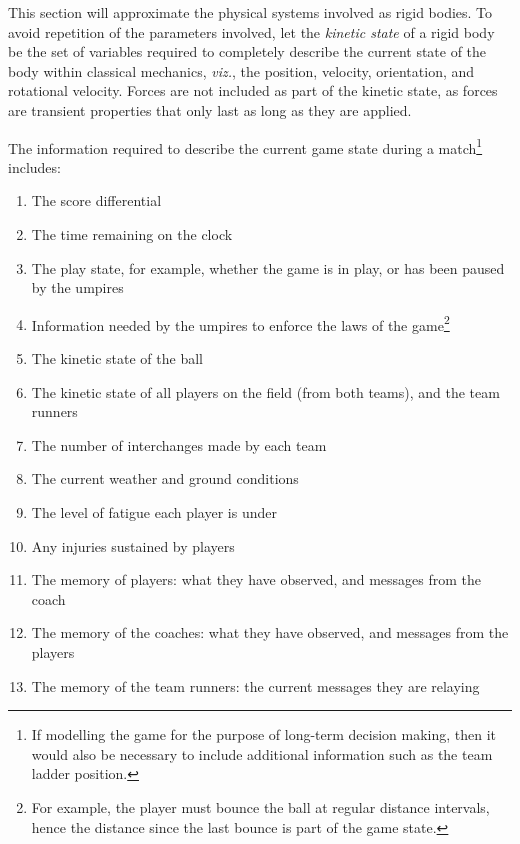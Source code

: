 
This section will approximate the physical systems involved as rigid bodies. To avoid repetition of the parameters involved, let the \textit{kinetic state} of a rigid body be the set of variables required to completely describe the current state of the body within classical mechanics, \textit{viz.}, the position, velocity,
orientation, and rotational velocity. Forces are not included as part of the kinetic state, as forces are transient properties that only last as long as they are applied.

The information required to describe the current game state during a match\footnote{If modelling the game for the purpose of long-term decision making, then it would also be necessary to include additional information such as the team ladder position.} includes:

\begin{enumerate}
\item
  The score differential
\item
  The time remaining on the clock
\item
  The play state, for example, whether the game is in play, or has been
  paused by the umpires
\item
  Information needed by the umpires to enforce the laws of the game\footnote{For
  example, the player must bounce the ball at regular distance
  intervals, hence the distance since the last bounce is part of the
  game state.}
\item
  The kinetic state of the ball
\item
  The kinetic state of all players on the field (from both teams), and the team runners
\item
  The number of interchanges made by each team
\item
  The current weather and ground conditions
\item
  The level of fatigue each player is under
\item
  Any injuries sustained by players
\item
  The memory of players: what they have observed, and messages from the
  coach
\item
  The memory of the coaches: what they have observed, and messages from
  the players
\item
  The memory of the team runners: the current messages they are relaying
\end{enumerate}

